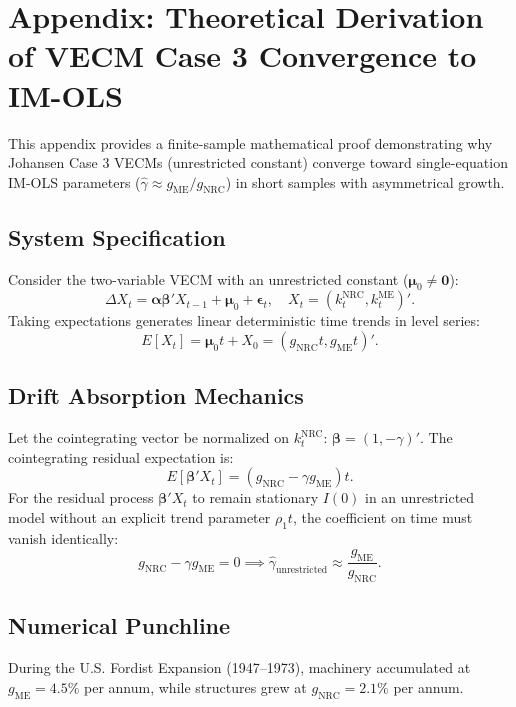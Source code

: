 \documentclass[11pt,a4paper]{article}
\begin{document}
\FloatBarrier
\section*{Appendix: Theoretical Derivation of VECM Case 3 Convergence to IM-OLS}

This appendix provides a finite-sample mathematical proof demonstrating why Johansen Case 3 VECMs (unrestricted constant) converge toward single-equation IM-OLS parameters ($\hat{\gamma} \approx g_{\text{ME}} / g_{\text{NRC}}$) in short samples with asymmetrical growth.

\subsection*{System Specification}
Consider the two-variable VECM with an unrestricted constant ($\boldsymbol{\mu}_0 \neq \mathbf{0}$):
\begin{equation}
\Delta X_t = \boldsymbol{\alpha} \boldsymbol{\beta}' X_{t-1} + \boldsymbol{\mu}_0 + \boldsymbol{\epsilon}_t, \quad X_t = (k_t^{\text{NRC}}, k_t^{\text{ME}})'.
\end{equation}
Taking expectations generates linear deterministic time trends in level series:
\begin{equation}
E[X_t] = \boldsymbol{\mu}_0 t + X_0 = (g_{\text{NRC}} t, g_{\text{ME}} t)'.
\end{equation}

\subsection*{Drift Absorption Mechanics}
Let the cointegrating vector be normalized on $k^{\text{NRC}}_t$: $\boldsymbol{\beta} = (1, -\gamma)'$. The cointegrating residual expectation is:
\begin{equation}
E[\boldsymbol{\beta}' X_t] = (g_{\text{NRC}} - \gamma g_{\text{ME}}) t.
\end{equation}
For the residual process $\boldsymbol{\beta}' X_t$ to remain stationary $I(0)$ in an unrestricted model without an explicit trend parameter $\rho_1 t$, the coefficient on time must vanish identically:
\begin{equation}
g_{\text{NRC}} - \gamma g_{\text{ME}} = 0 \implies \hat{\gamma}_{\text{unrestricted}} \approx \frac{g_{\text{ME}}}{g_{\text{NRC}}}.
\end{equation}

\subsection*{Numerical Punchline}
During the U.S. Fordist Expansion (1947--1973), machinery accumulated at $g_{\text{ME}} = 4.5\%$ per annum, while structures grew at $g_{\text{NRC}} = 2.1\%$ per annum. 
\end{document}
